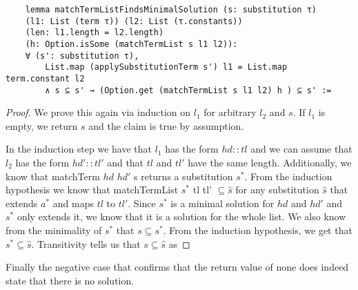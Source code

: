 \begin{lstlisting}
    lemma matchTermListFindsMinimalSolution (s: substitution τ)
    (l1: List (term τ)) (l2: List (τ.constants)) 
    (len: l1.length = l2.length) 
    (h: Option.isSome (matchTermList s l1 l2)):
    ∀ (s': substitution τ), 
        List.map (applySubstitutionTerm s') l1 = List.map term.constant l2
        ∧ s ⊆ s' → (Option.get (matchTermList s l1 l2) h ) ⊆ s' :=
\end{lstlisting}
\begin{proof}
    We prove this again via induction on $l_1$ for arbitrary $l_2$ and $s$. If $l_1$ is empty, we return $s$ and the claim is true by assumption.

    In the induction step we have that $l_1$ has the form $hd::tl$ and we can assume that $l_2$ has the form $hd'::tl'$ and that $tl$ and $tl'$ have the same length. Additionally, we know that matchTerm $hd$ $hd'$ s returns a substitution $s^\ast$. From the induction hypothesis we know that matchTermList $s^\ast$ tl tl' $\subseteq \hat{s}$ for any substitution $\hat{s}$ that extends $a^\ast$ and maps $tl$ to $tl'$. Since $s^\ast$ is a minimal solution for $hd$ and $hd'$ and $s^\ast$ only extends it, we know that it is a solution for the whole list. We also know from the minimality of $s^\ast$ that $s \subseteq s^\ast$. From the induction hypothesis, we get that $s^\ast \subseteq \hat{s}$. Transitivity tells us that $s \subseteq \hat{s}$ as 
\end{proof}

Finally the negative case that confirms that the return value of none does indeed state that there is no solution.

